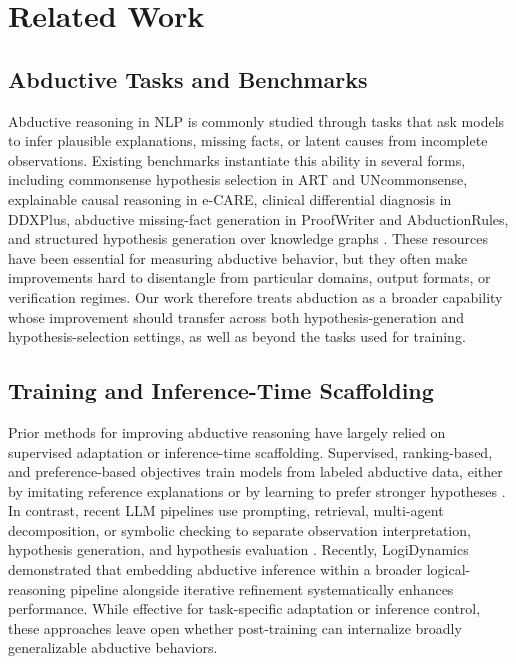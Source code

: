 \documentclass[11pt]{article}
\begin{document}
\section{Related Work}
\label{sec:related_work}

\subsection{Abductive Tasks and Benchmarks}

Abductive reasoning in NLP is commonly studied through tasks that ask models to infer plausible explanations, missing facts, or latent causes from incomplete observations. Existing benchmarks instantiate this ability in several forms, including commonsense hypothesis selection in ART and UNcommonsense, explainable causal reasoning in e-CARE, clinical differential diagnosis in DDXPlus, abductive missing-fact generation in ProofWriter and AbductionRules, and structured hypothesis generation over knowledge graphs \citep{bhagavatula2019abductive-commonsense-reasoning,zhao2023uncommonsense,du2022ecare,Tchango2022ddxplus,tafjord2020proofwriter,young2022abductionrules,bai2023abductive-kg}. These resources have been essential for measuring abductive behavior, but they often make improvements hard to disentangle from particular domains, output formats, or verification regimes. Our work therefore treats abduction as a broader capability whose improvement should transfer across both hypothesis-generation and hypothesis-selection settings, as well as beyond the tasks used for training.

\subsection{Training and Inference-Time Scaffolding}

Prior methods for improving abductive reasoning have largely relied on supervised adaptation or inference-time scaffolding. Supervised, ranking-based, and preference-based objectives train models from labeled abductive data, either by imitating reference explanations or by learning to prefer stronger hypotheses \citep{zhu2020l2r2,he2025gear}. In contrast, recent LLM pipelines use prompting, retrieval, multi-agent decomposition, or symbolic checking to separate observation interpretation, hypothesis generation, and hypothesis evaluation \citep{liu2024incomplete-loop-instruction-inference,lin2025abductiveinferenceretrievalaugmentedlanguage,he2023lego,li2025hypothesis,hong2024argmed}. Recently, LogiDynamics \citep{zheng2025logidynamics} demonstrated that embedding abductive inference within a broader logical-reasoning pipeline alongside iterative refinement systematically enhances performance. While effective for task-specific adaptation or inference control, these approaches leave open whether post-training can internalize broadly generalizable abductive behaviors.
\end{document}
